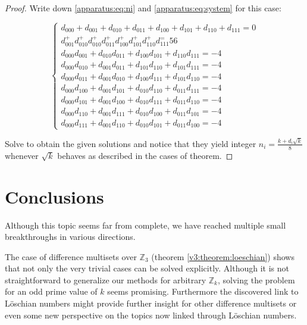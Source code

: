 \documentclass{article}
\theoremstyle{plain}
\theoremstyle{definition}
\theoremstyle{remark}
\begin{document}
			\begin{proof}
				Write down \eqref{apparatus:eq:ni} and \eqref{apparatus:eq:system} for this case:
				
				\begin{equation}
					\begin{cases}
                        d_{000} + d_{001} + d_{010} + d_{011} + d_{100}  + d_{101}  + d_{110}  + d_{111} = 0 \\
                        d_{001}^+ d_{010}^+ d_{010}^+ d_{011}^+ d_{100}^ + d_{101}^ + d_{110}^ + d_{111}^= 56 \\
                        d_{000} d_{001} + d_{010} d_{011} + d_{100} d_{101} +  d_{110} d_{111} = -4 \\
                        d_{000} d_{010} + d_{001} d_{011} + d_{101} d_{110} +  d_{101} d_{111} = -4 \\
                        d_{000} d_{011} + d_{001} d_{010} + d_{100} d_{111} +  d_{101} d_{110} = -4 \\
                        d_{000} d_{100} + d_{001} d_{101} + d_{010} d_{110} +  d_{011} d_{111} = -4 \\
                        d_{000} d_{101} +  d_{001} d_{100} + d_{010} d_{111} + d_{011} d_{110} = -4 \\
                        d_{000} d_{110} + d_{001} d_{111} + d_{010} d_{100} + d_{011} d_{101} = -4 \\
                        d_{000} d_{111} + d_{001} d_{110} + d_{010} d_{101} +  d_{011} d_{100} = -4
					\end{cases}
				\end{equation}
				
				Solve to obtain the given solutions and notice that they yield integer $n_i = \frac{k+d_i \sqrt k}8$ whenever $\sqrt k$ behaves as described in the cases of theorem.
			\end{proof}

	\section{Conclusions}
		Although this topic seems far from complete, we have reached multiple small breakthroughs in various directions.
		
		The case of difference multisets over $\mathbb Z_3$ (theorem \ref{v3:theorem:loeschian}) shows that not only the very trivial cases can be solved explicitly. Although it is not straightforward to generalize our methods for arbitrary $\mathbb Z_k$, solving the problem for an odd prime value of $k$ seems promising. Furthermore the discovered link to Löschian numbers might provide further insight for other difference multisets or even some new perspective on the topics now linked through Löschian numbers.
		
\end{document}
